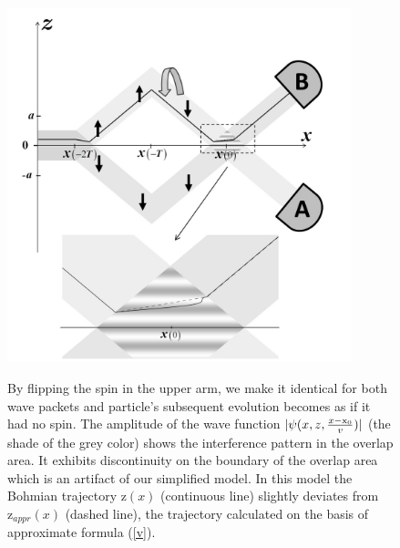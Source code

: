 \documentclass[preprint,tightenlines]{elsarticle}
\begin{document}
\begin{figure}[H]\vspace{-10pt}
  \includegraphics[width=10cm]{8.pdf}\\\vspace{-5pt}
    \caption{ By flipping the spin in the upper arm, we make it identical for both wave packets and particle's subsequent evolution becomes as if it had no spin. The amplitude of the wave function $|\psi(x,z,\frac{x-{\rm x}_0}{v})|$ (the shade of the grey color) shows  the interference pattern in the overlap area. It exhibits discontinuity on the boundary of the overlap area which is an artifact of our simplified model. In this model the Bohmian trajectory  $\mathrm{z}(x)$ (continuous line) slightly deviates from  $\mathrm{z}_{appr}(x)$ (dashed line), the trajectory calculated on the basis of approximate formula (\ref{v}). }
\end{figure}
\end{document}
